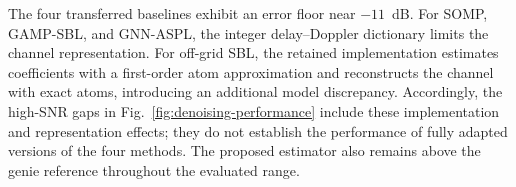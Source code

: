 The four transferred baselines exhibit an error floor near $-11$~dB.
For SOMP, GAMP-SBL, and GNN-ASPL, the integer delay--Doppler dictionary
limits the channel representation. For off-grid SBL, the retained
implementation estimates coefficients with a first-order atom
approximation and reconstructs the channel with exact atoms, introducing
an additional model discrepancy. Accordingly, the high-SNR gaps in
Fig.~\ref{fig:denoising-performance} include these implementation and
representation effects; they do not establish the performance of
fully adapted versions of the four methods. The proposed estimator
also remains above the genie reference throughout the evaluated range.
